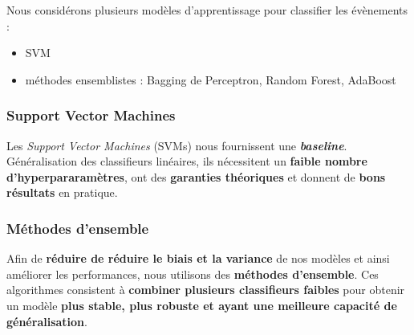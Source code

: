 \documentclass[12pt]{article}
\begin{document}
Nous considérons plusieurs modèles d'apprentissage pour classifier les
évènements :

\begin{itemize}
    \item SVM
    \item méthodes ensemblistes : Bagging de Perceptron, Random Forest, AdaBoost
\end{itemize}

\subsubsection{Support Vector Machines}

Les \emph{Support Vector Machines} (SVMs) nous fournissent une
\textbf{\emph{baseline}}. Généralisation des classifieurs linéaires, ils
nécessitent un \textbf{faible nombre d'hyperpararamètres}, ont des
\textbf{garanties théoriques} et donnent de \textbf{bons résultats} en pratique.

\subsubsection{Méthodes d'ensemble}

Afin de \textbf{réduire de réduire le biais et la variance} de nos modèles et
ainsi améliorer les performances, nous utilisons des \textbf{méthodes
d'ensemble}. Ces algorithmes consistent à \textbf{combiner plusieurs classifieurs
faibles} pour obtenir un modèle \textbf{plus stable, plus robuste et ayant une meilleure
capacité de généralisation}. \\
\end{document}
